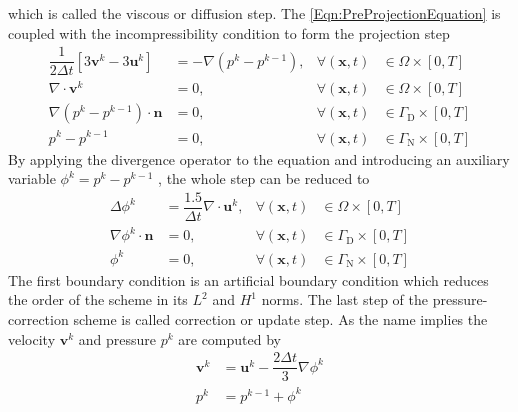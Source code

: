 \documentclass[]{scrartcl}
\newcommand{\bs}[1]{\boldsymbol{#1}}
\begin{document}
which is called the viscous or diffusion step. The \cref{Eqn:PreProjectionEquation} is coupled with the incompressibility condition to form the projection step
\begin{equation*}
\begin{aligned}
		\dfrac{1}{2\Delta t} \left[3\bs{v}^{k} - 3\bs{u}^{k} \right] &= -\nabla (p^{k} - p^{k-1}), &\forall (\bs{x}, t) &\in \Omega \times \left[0, T \right] \\
		\nabla \cdot \bs{v}^{k} &= 0, &\forall (\bs{x}, t) &\in \Omega \times \left[0, T \right] \\
	\nabla(p^{k} - p^{k-1}) \cdot \bs{n} &= 0, &\forall (\bs{x}, t) &\in \Gamma_\textrm{D} \times \left[0, T \right] \\
		p^{k} - p^{k-1} &=0, &\forall\left(\bs{x}, t\right) &\in \Gamma_\textrm{N} \times \left[0, T \right]
\end{aligned}	
\end{equation*}
By applying the divergence operator to the equation and introducing an auxiliary variable $\phi^{k} = p^{k} - p^{k-1}$ , the whole step can be reduced to
\begin{equation*}
\begin{aligned}
	\Delta \phi^{k} &= \dfrac{1.5}{\Delta t} \nabla \cdot \bs{u}^{k},  &\forall (\bs{x}, t) &\in \Omega \times \left[0, T \right] \\
	\nabla \phi^{k} \cdot \bs{n} &= 0, &\forall (\bs{x}, t) &\in \Gamma_\textrm{D} \times \left[0, T \right] \\
	\phi^{k} &= 0, &\forall\left(\bs{x}, t\right) &\in \Gamma_\textrm{N} \times \left[0, T \right]
\end{aligned}
\end{equation*}
The first boundary condition is an artificial boundary condition which reduces the order of the scheme in its $L^2$ and $H^1$ norms. The last step of the pressure-correction scheme is called correction or update step. As the name implies the velocity $\bs{v}^{k}$ and pressure $p^{k}$ are computed by
\begin{equation*}
\begin{aligned}
	\bs{v}^{k} &= \bs{u}^{k} - \dfrac{2\Delta t}{3} \nabla \phi^{k} \\
	p^{k} &= p^{k-1} + \phi^{k}
\end{aligned}
\end{equation*}
\end{document}
